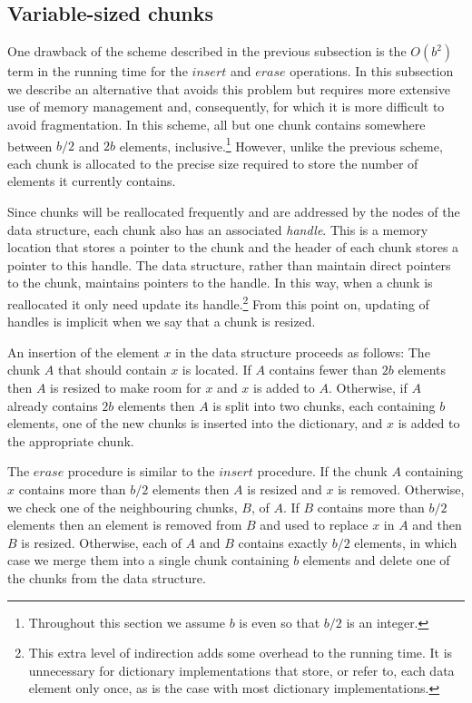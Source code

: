 \documentclass{DIKU-article}
\newcommand{\Insert}{\mbox{$\mathit{insert}$}}
\newcommand{\Erase}{\mbox{$\mathit{erase}$}}
\begin{document}
\subsection{Variable-sized chunks}

One drawback of the scheme described in the previous subsection is the
$O(b^2)$ term in the running time for the \Insert{} and \Erase{}
operations.  In this subsection we describe an alternative that avoids
this problem but requires more extensive use of memory management and,
consequently, for which it is more difficult to avoid fragmentation.
In this scheme, all but one chunk contains somewhere between $b/2$ and
$2b$ elements, inclusive.\footnote{Throughout this section we assume
$b$ is even so that $b/2$ is an integer.}  However, unlike the
previous scheme, each chunk is allocated to the precise size required
to store the number of elements it currently contains.

Since chunks will be reallocated frequently and are addressed by the
nodes of the data structure, each chunk also has an associated
\emph{handle}.  This is a memory location that stores a pointer to the
chunk and the header of each chunk stores a pointer to this handle.
The data structure, rather than maintain direct pointers to the
chunk, maintains pointers to the handle.  In this way, when a chunk
is reallocated it only need update its handle.\footnote{This extra
level of indirection adds some overhead to the running time.  It is
unnecessary for dictionary implementations that store, or refer to,
each data element only once, as is the case with most dictionary
implementations.} From this point on, updating of handles is implicit
when we say that a chunk is resized.

An insertion of the element $x$ in the data structure proceeds as
follows: The chunk $A$ that should contain $x$ is located.  If $A$
contains fewer than $2b$ elements then $A$ is resized to make room for
$x$ and $x$ is added to $A$.  Otherwise, if $A$ already contains $2b$
elements then $A$ is split into two chunks, each containing $b$
elements, one of the new chunks is inserted into the dictionary, and
$x$ is added to the appropriate chunk.

The \Erase{} procedure is similar to the \Insert{} procedure.  If the
chunk $A$ containing $x$ contains more than $b/2$ elements then $A$ is
resized and $x$ is removed.  Otherwise, we check one of the
neighbouring chunks, $B$, of $A$. If $B$ contains more than $b/2$
elements then an element is removed from $B$ and used to replace $x$
in $A$ and then $B$ is resized. Otherwise, each of $A$ and $B$
contains exactly $b/2$ elements, in which case we merge them into a
single chunk containing $b$ elements and delete one of the chunks from
the data structure.
\end{document}

